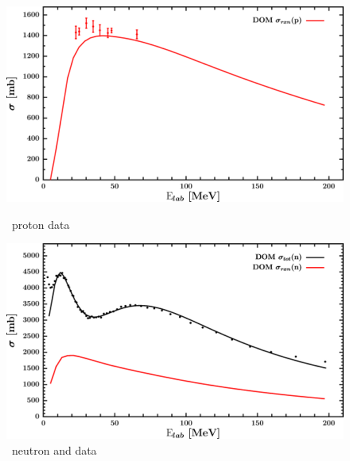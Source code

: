 \begin{figure}[H]
    \centering
    \begin{minipage}{0.45\textwidth}
        \centering
        \includegraphics[width=1.0\textwidth]{figures/sn112_protonInelastic.png}
        \caption{\snTwelve\ proton \rxn data}
        \label{DOMFitData_sn112_proton_inelastic}
    \end{minipage}\hfill
    \begin{minipage}{0.45\textwidth}
        \centering
        \includegraphics[width=1.0\textwidth]{figures/sn112_neutronInelastic.png}
        \caption{\snTwelve\ neutron \rxn and \tot data}
        \label{DOMFitData_sn112_neutron_inelastic}
    \end{minipage}
\end{figure}

\afterpage{\clearpage}

